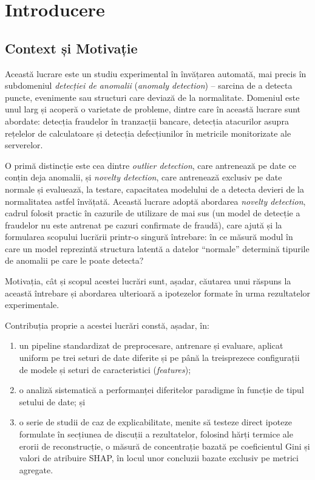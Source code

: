 \chapter{Introducere}
\label{ch:introducere}

\section{Context și Motivație}

Această lucrare este un studiu experimental în învățarea automată, mai precis în subdomeniul \emph{detecției de anomalii} (\emph{anomaly detection}) -- sarcina de a detecta puncte, evenimente sau structuri care deviază de la normalitate. Domeniul este unul larg și acoperă o varietate de probleme, dintre care în această lucrare sunt abordate: detecția fraudelor în tranzacții bancare, detecția atacurilor asupra rețelelor de calculatoare și detecția defecțiunilor în metricile monitorizate ale serverelor.

O primă distincție este cea dintre \emph{outlier detection}, care antrenează pe date ce conțin deja anomalii, și \emph{novelty detection}, care antrenează exclusiv pe date normale și evaluează, la testare, capacitatea modelului de a detecta devieri de la normalitatea astfel învățată. Această lucrare adoptă abordarea \emph{novelty detection}, cadrul folosit practic în cazurile de utilizare de mai sus (un model de detecție a fraudelor nu este antrenat pe cazuri confirmate de fraudă), care ajută și la formularea scopului lucrării printr-o singură întrebare: în ce măsură modul în care un model reprezintă structura latentă a datelor \enquote{normale} determină tipurile de anomalii pe care le poate detecta?

Motivația, cât și scopul acestei lucrări sunt, așadar, căutarea unui răspuns la această întrebare și abordarea ulterioară a ipotezelor formate în urma rezultatelor experimentale.

Contribuția proprie a acestei lucrări constă, așadar, în:

\begin{enumerate}
    \item un pipeline standardizat de preprocesare, antrenare și evaluare, aplicat uniform pe trei seturi de date diferite și pe până la treisprezece configurații de modele și seturi de caracteristici (\emph{features});
    \item o analiză sistematică a performanței diferitelor paradigme în funcție de tipul setului de date; și
    \item o serie de studii de caz de explicabilitate, menite să testeze direct ipoteze formulate în secțiunea de discuții a rezultatelor, folosind hărți termice ale erorii de reconstrucție, o măsură de concentrație bazată pe coeficientul Gini și valori de atribuire SHAP, în locul unor concluzii bazate exclusiv pe metrici agregate.
\end{enumerate}

